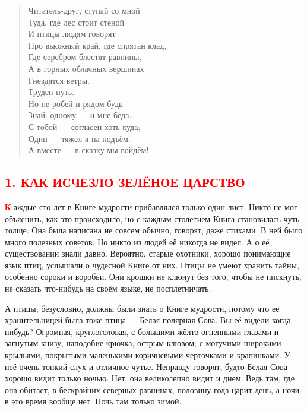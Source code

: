 \documentclass[oneside,final,14pt]{extreport}
\begin{document}
	\thispagestyle{empty} %
	
	\newpage
	
	\begin{flushleft}
		\begin{verse}
			\qquad \qquad Читатель-друг, ступай со мной\\
			\qquad \qquad Туда, где лес стоит стеной\\
			\qquad \qquad И птицы людям говорят\\
			\qquad \qquad Про вьюжный край, где спрятан клад,\\
			\qquad \qquad Где серебром блестят равнины,\\
			\qquad \qquad А в горных облачных вершинах\\
			\qquad \qquad Гнездятся ветры.\\
			\qquad \qquad\qquad\qquad\qquad\qquad Труден путь.\\
			\qquad \qquad Но не робей и рядом будь.\\
			\qquad \qquad Знай: одному — и мне беда.\\
			\qquad \qquad С тобой — согласен хоть куда;\\
			\qquad \qquad Один — тяжел я на подъём.\\
			\qquad \qquad А вместе — в сказку мы войдём!\\
		\end{verse}
	\end{flushleft}
	
	{%
		\centering
		\subsection*{\textcolor{red}{1. КАК ИСЧЕЗЛО ЗЕЛЁНОЕ ЦАРСТВО}}
	}
	
	\lettrine[findent=0pt]{\textbf{\textcolor{red}{К}}}{} аждые сто лет в Книге мудрости прибавлялся только один лист. Никто не мог объяснить, как это происходило, но с каждым столетием Книга становилась чуть толще. Она была написана не совсем обычно, говорят, даже стихами. В ней было много полезных советов. Но никто из людей её никогда не видел. А о её существовании знали давно. Вероятно, старые охотники, хорошо понимающие язык птиц, услышали о чудесной Книге от них. Птицы не умеют хранить тайны, особенно сороки и воробьи. Они крошки не клюнут без того, чтобы не пискнуть, не сказать что-нибудь на своём языке, не посплетничать.
	
	А птицы, безусловно, должны были знать о Книге мудрости, потому что её хранительницей была тоже птица — Белая полярная Сова. Вы её видели когда-нибудь? Огромная, круглоголовая, с большими жёлто-огненными глазами и загнутым книзу, наподобие крючка, острым клювом; с могучими широкими крыльями, покрытыми маленькими коричневыми черточками и крапинками. У неё очень тонкий слух и отличное чутье. Неправду говорят, будто Белая Сова хорошо видит только ночью. Нет, она великолепно видит и днем. Ведь там, где она обитает, в бескрайних северных равнинах, половину года царит день, а ночи в это время вообще нет. Ночь там только зимой.
	
\end{document}
